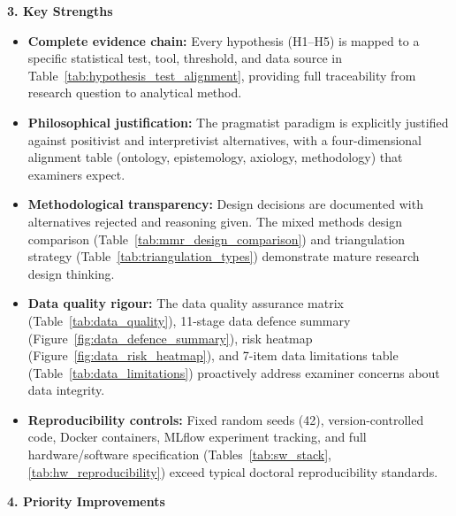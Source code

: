 \noindent\textbf{\color{ggunavy}3. Key Strengths}

\begin{itemize}[nosep]
\item \textbf{Complete evidence chain:} Every hypothesis (H1--H5) is mapped to a specific statistical test, tool, threshold, and data source in Table~\ref{tab:hypothesis_test_alignment}, providing full traceability from research question to analytical method.
\item \textbf{Philosophical justification:} The pragmatist paradigm is explicitly justified against positivist and interpretivist alternatives, with a four-dimensional alignment table (ontology, epistemology, axiology, methodology) that examiners expect.
\item \textbf{Methodological transparency:} Design decisions are documented with alternatives rejected and reasoning given. The mixed methods design comparison (Table~\ref{tab:mmr_design_comparison}) and triangulation strategy (Table~\ref{tab:triangulation_types}) demonstrate mature research design thinking.
\item \textbf{Data quality rigour:} The data quality assurance matrix (Table~\ref{tab:data_quality}), 11-stage data defence summary (Figure~\ref{fig:data_defence_summary}), risk heatmap (Figure~\ref{fig:data_risk_heatmap}), and 7-item data limitations table (Table~\ref{tab:data_limitations}) proactively address examiner concerns about data integrity.
\item \textbf{Reproducibility controls:} Fixed random seeds (42), version-controlled code, Docker containers, MLflow experiment tracking, and full hardware/software specification (Tables~\ref{tab:sw_stack}, \ref{tab:hw_reproducibility}) exceed typical doctoral reproducibility standards.
\end{itemize}

\noindent\textbf{\color{ggunavy}4. Priority Improvements}

